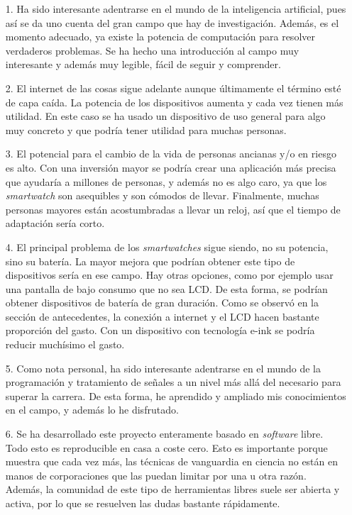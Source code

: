 \documentclass[12pt]{book}
\numberwithin{equation}{section}
\begin{document}
\begin{enumerate}
\item[1.] Ha sido interesante adentrarse en el mundo de la inteligencia artificial, pues así se da uno cuenta del gran campo que hay de investigación. Además, es el momento adecuado, ya existe la potencia de computación para resolver verdaderos problemas. Se ha hecho una introducción al campo muy interesante y además muy legible, fácil de seguir y comprender.

\item[2.] El internet de las cosas sigue adelante aunque últimamente el término esté de capa caída. La potencia de los dispositivos aumenta y cada vez tienen más utilidad. En este caso se ha usado un dispositivo de uso general para algo muy concreto y que podría tener utilidad para muchas personas.

\item[3.] El potencial para el cambio de la vida de personas ancianas y/o en riesgo es alto. Con una inversión mayor se podría crear una aplicación más precisa que ayudaría a millones de personas, y además no es algo caro, ya que los \textit{smartwatch} son asequibles y son cómodos de llevar. Finalmente, muchas personas mayores están acostumbradas a llevar un reloj, así que el tiempo de adaptación sería corto.

\item[4.] El principal problema de los \textit{smartwatches} sigue siendo, no su potencia, sino su batería. La mayor mejora que podrían obtener este tipo de dispositivos sería en ese campo. Hay otras opciones, como por ejemplo usar una pantalla de bajo consumo que no sea LCD. De esta forma, se podrían obtener dispositivos de batería de gran duración. Como se observó en la sección de antecedentes, la conexión a internet y el LCD hacen bastante proporción del gasto. Con un dispositivo con tecnología e-ink se podría reducir muchísimo el gasto.

\item[5.] Como nota personal, ha sido interesante adentrarse en el mundo de la programación y tratamiento de señales a un nivel más allá del necesario para superar la carrera. De esta forma, he aprendido y ampliado mis conocimientos en el campo, y además lo he disfrutado.

\item[6.] Se ha desarrollado este proyecto enteramente basado en \textit{software} libre. Todo esto es reproducible en casa a coste cero. Esto es importante porque muestra que cada vez más, las técnicas de vanguardia en ciencia no están en manos de corporaciones que las puedan limitar por una u otra razón. Además, la comunidad de este tipo de herramientas libres suele ser abierta y activa, por lo que se resuelven las dudas bastante rápidamente.
\end{enumerate}
\end{document}
